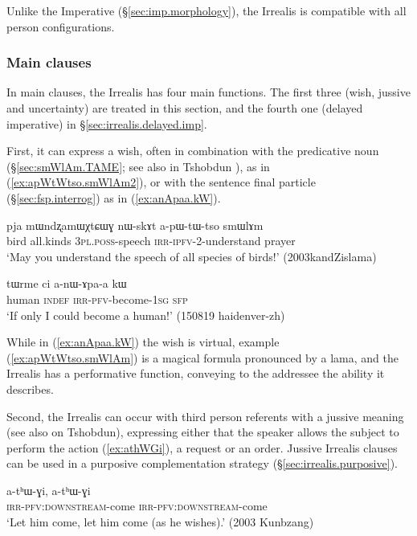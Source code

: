 Unlike the Imperative (§\ref{sec:imp.morphology}), the Irrealis is compatible with all person configurations.

\subsubsection{Main clauses} \label{sec:irrealis.main}
In main clauses, the Irrealis has four main functions. The first three (wish, jussive and uncertainty) are treated in this section, and the fourth one (delayed imperative) in §\ref{sec:irrealis.delayed.imp}.

First, it can express a wish, often in combination with the predicative noun  (§\ref{sec:smWlAm.TAME}; see also in Tshobdun \citealt[804]{jackson07irrealis}), as in (\ref{ex:apWtWtso.smWlAm2}), or with the sentence final particle  (§\ref{sec:fsp.interrog}) as in (\ref{ex:anApaa.kW}).

\begin{exe}
\ex \label{ex:apWtWtso.smWlAm2}
\gll pja mɯndʐamɯχtɕɯɣ nɯ-skɤt a-pɯ-tɯ-tso smɯlɤm\\
bird all.kinds \textsc{3pl}.\textsc{poss}-speech \textsc{irr}-\textsc{ipfv}-2-understand prayer\\
\glt `May you understand the speech of all species of birds!' (2003kandZislama)
\end{exe}

\begin{exe}
\ex \label{ex:anApaa.kW}
\gll tɯrme ci a-nɯ-ɤpa-a kɯ \\
human \textsc{indef} \textsc{irr}-\textsc{pfv}-become-\textsc{1sg} \textsc{sfp} \\
\glt `If only I could become a human!' (150819 haidenver-zh) 
\end{exe}
 
While in (\ref{ex:anApaa.kW}) the wish is virtual, example (\ref{ex:apWtWtso.smWlAm}) is a magical formula pronounced by a lama, and the Irrealis has a performative function, conveying to the addressee the ability it describes.


Second, the Irrealis can occur with third person referents with a jussive meaning (see also \citealt[811]{jackson07irrealis} on Tshobdun), expressing either that the speaker allows the subject to perform the action (\ref{ex:athWGi}), a request or an order. Jussive Irrealis clauses can be used in a purposive complementation strategy (§\ref{sec:irrealis.purposive}).

\begin{exe}
\ex \label{ex:athWGi}
\gll a-tʰɯ-ɣi, a-tʰɯ-ɣi \\
\textsc{irr}-\textsc{pfv}:\textsc{downstream}-come \textsc{irr}-\textsc{pfv}:\textsc{downstream}-come \\
\glt `Let him come, let him come (as he wishes).' (2003 Kunbzang)
\end{exe}

